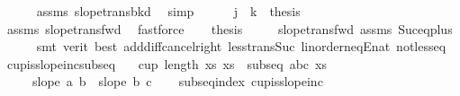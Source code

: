\begin{isabellebody}
\ \ \ \ \isamarkupfalse%
\ assms\ slope{\isacharunderscore}{\kern0pt}trans{\isacharunderscore}{\kern0pt}bkd\ \isamarkupfalse%
\ simp\isanewline
\ \ \isamarkupfalse%
\ \ \ {\isachardoublequoteopen}j{\isacharplus}{\kern0pt}{}\ {\isacharequal}{\kern0pt}\ k\ {\isasymLongrightarrow}\ {\isacharquery}{\kern0pt}thesis{\isachardoublequoteclose}\isanewline
\ \ \ \ \isamarkupfalse%
\ assms{\isacharparenleft}{\kern0pt}{}{\isacharcomma}{\kern0pt}{}{\isacharparenright}{\kern0pt}\ slope{\isacharunderscore}{\kern0pt}trans{\isacharunderscore}{\kern0pt}fwd\ \isamarkupfalse%
\ fastforce\isanewline
\ \ \isamarkupfalse%
\ {\isacharquery}{\kern0pt}thesis\ \isamarkupfalse%
\ {}\ {}\ {}\ slope{\isacharunderscore}{\kern0pt}trans{\isacharunderscore}{\kern0pt}fwd\ assms\ Suc{\isacharunderscore}{\kern0pt}eq{\isacharunderscore}{\kern0pt}plus{}\isanewline
\ \ \ \ \isamarkupfalse%
\ {\isacharparenleft}{\kern0pt}smt\ {\isacharparenleft}{\kern0pt}verit{\isacharcomma}{\kern0pt}\ best{\isacharparenright}{\kern0pt}\ add{\isacharunderscore}{\kern0pt}diff{\isacharunderscore}{\kern0pt}cancel{\isacharunderscore}{\kern0pt}right{\isacharprime}{\kern0pt}\ less{\isacharunderscore}{\kern0pt}trans{\isacharunderscore}{\kern0pt}Suc\ linorder{\isacharunderscore}{\kern0pt}neqE{\isacharunderscore}{\kern0pt}nat\ not{\isacharunderscore}{\kern0pt}less{\isacharunderscore}{\kern0pt}eq{\isacharparenright}{\kern0pt}\isanewline
{}\isamarkupfalse%
%
\endisatagproof
{\isafoldproof}%
%
\isadelimproof
\isanewline
%
\endisadelimproof
\isanewline
{}\isamarkupfalse%
\ cup{\isacharunderscore}{\kern0pt}is{\isacharunderscore}{\kern0pt}slopeinc{\isacharunderscore}{\kern0pt}subseq{\isacharcolon}{\kern0pt}\isanewline
\ \ \ {\isachardoublequoteopen}cup\ {\isacharparenleft}{\kern0pt}length\ xs{\isacharparenright}{\kern0pt}\ xs{\isachardoublequoteclose}\ \ {\isachardoublequoteopen}subseq\ {\isacharbrackleft}{\kern0pt}a{\isacharcomma}{\kern0pt}b{\isacharcomma}{\kern0pt}c{\isacharbrackright}{\kern0pt}\ xs{\isachardoublequoteclose}\isanewline
\ \ \ \ \ {\isachardoublequoteopen}slope\ a\ b\ {\isacharless}{\kern0pt}\ slope\ b\ c{\isachardoublequoteclose}\isanewline
%
\isadelimproof
\ \ %
\endisadelimproof
%
\isatagproof
{}\isamarkupfalse%
\ subseq{\isacharunderscore}{\kern0pt}index{}\ cup{\isacharunderscore}{\kern0pt}is{\isacharunderscore}{\kern0pt}slopeinc\isanewline

\end{isabellebody}
